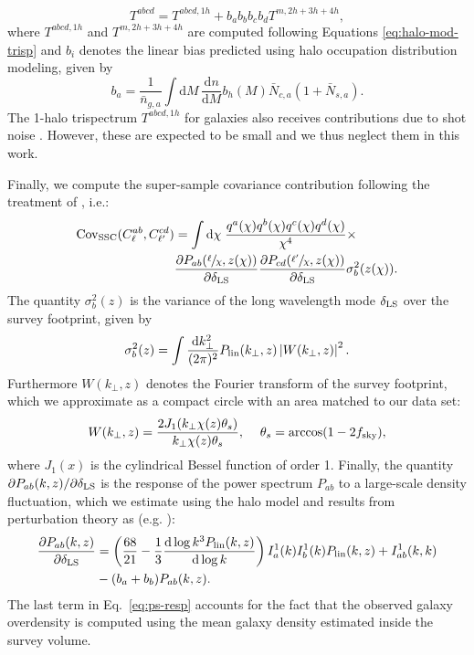 \documentclass[a4paper,11pt]{article}
\begin{document}
    \begin{equation}
      T^{abcd} = T^{abcd, 1h} + b_{a}b_{b}b_{c}b_{d}T^{m, 2h+3h+4h},
    \end{equation}
where $T^{abcd, 1h}$ and $T^{m, 2h+3h+4h}$ are computed following Equations \ref{eq:halo-mod-trisp} and $b_{i}$ denotes the linear bias predicted using halo occupation distribution modeling, given by
    \begin{equation}
      b_{a}=\frac{1}{\bar{n}_{g, a}}\int \mathrm{d}M\,\frac{\mathrm{d}n}{\mathrm{d}M}b_{h}(M) \bar{N}_{c, a}(1+\bar{N}_{s, a}).
    \end{equation}
    The 1-halo trispectrum $T^{abcd, 1h}$ for galaxies also receives contributions due to shot noise \cite{Lacasa:2018}. However, these are expected to be small \cite{Lacasa:2018} and we thus neglect them in this work.

    Finally, we compute the super-sample covariance contribution following the treatment of \cite{Krause:2017}, i.e.:
    \begin{align}
       \mathrm{Cov}_{\mathrm{SSC}}(C^{ab}_{\ell}, C^{cd}_{\ell'}) &= \int \mathrm{d}\chi \;\frac{q^{a}(\chi)q^{b}(\chi)q^{c}(\chi)q^{d}(\chi)}{\chi^{4}} \times \\ &\frac{\partial P_{ab}(\sfrac{\ell}{\chi}, z(\chi))}{\partial \delta_{\rm LS}}\frac{\partial P_{cd}(\sfrac{\ell'}{\chi}, z(\chi))}{\partial \delta_{\rm LS}}\sigma^{2}_{b}(z(\chi)).
    \end{align}
        The quantity $\sigma_b^2(z)$ is the variance of the long wavelength mode $\delta_{\rm LS}$ over the survey footprint, given by
    \begin{equation}
      \sigma_b^2(z) = \int \frac{\mathrm{d}k_\perp^2}{(2\pi)^2}P_{\rm lin}(k_\perp,z)\left|W(k_\perp,z)\right|^2.
    \end{equation}
    Furthermore $W(k_\perp,z)$ denotes the Fourier transform of the survey footprint, which we approximate as a compact circle with an area matched to our data set:
    \begin{equation}
      W(k_\perp,z)=\frac{2 J_1(k_\perp\chi(z)\theta_s)}{k_\perp \chi(z)\theta_s},\hspace{12pt} \theta_s={\rm arccos}(1-2f_{\rm sky}),
    \end{equation}
    where $J_1(x)$ is the cylindrical Bessel function of order 1.
    Finally, the quantity $\partial P_{ab}(k, z)/\partial \delta_{\rm LS}$ is the response of the power spectrum $P_{ab}$ to a large-scale density fluctuation, which we estimate using the halo model and results from perturbation theory as (e.g. \cite{Krause:2017}):
    \begin{align}
      \frac{\partial P_{ab}(k, z)}{\partial \delta_{\rm LS}} &= \left( \frac{68}{21} - \frac{1}{3}\frac{\mathrm{d}\log{k^{3} P_{\mathrm{lin}}}(k, z)}{\mathrm{d}\log k} \right) I_{a}^{1}(k)I_{b}^{1}(k)P_{\mathrm{lin}}(k, z) + I_{ab}^{1}(k, k) \\ &- (b_{a} + b_{b})P_{ab}(k, z).
    \label{eq:ps-resp}  
    \end{align}
The last term in Eq.~\ref{eq:ps-resp} accounts for the fact that the observed galaxy overdensity is computed using the mean galaxy density estimated inside the survey volume.
    
\end{document}
